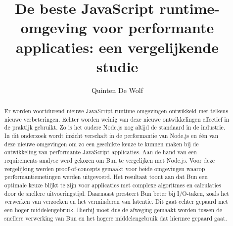 \documentclass[a0,portrait]{hogent-poster}
\title{De beste JavaScript runtime-omgeving voor performante applicaties: een vergelijkende studie}
\author{Quinten De Wolf}
\begin{document}
\maketitle

\begin{abstract}
Er worden voortdurend nieuwe JavaScript runtime-omgevingen ontwikkeld met telkens nieuwe verbeteringen. 
Echter worden weinig van deze nieuwe ontwikkelingen effectief in de praktijk gebruikt.
Zo is het oudere Node.js nog altijd de standaard in de industrie. 
In dit onderzoek wordt inzicht verschaft in de performantie van Node.js en één van deze nieuwe omgevingen 
om zo een geschikte keuze te kunnen maken bij de ontwikkeling van performante JavaScript applicaties.
Aan de hand van een requirements analyse werd gekozen om Bun te vergelijken met Node.js.
Voor deze vergelijking werden proof-of-concepts gemaakt voor beide omgevingen waarop performantiemetingen werden uitgevoerd.
Het resultaat toont aan dat Bun een optimale keuze blijkt te zijn voor applicaties met complexe algoritmes en calculaties door de snellere uitvoeringstijd.
Daarnaast presteert Bun beter bij I/O-taken, zoals het verwerken van verzoeken en het verminderen van latentie. Dit gaat echter gepaard met een hoger middelengebruik.
Hierbij moet dus de afweging gemaakt worden tussen de snellere verwerking van Bun en het hogere middelengebruik dat hiermee gepaard gaat.
\end{abstract}
\end{document}
